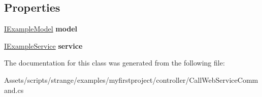 \subsection*{Properties}
\begin{DoxyCompactItemize}
\item 
\hypertarget{classstrange_1_1examples_1_1myfirstproject_1_1_call_web_service_command_ae4ff81e65df7887774bc975453f9d325}{\hyperlink{interfacestrange_1_1examples_1_1myfirstproject_1_1_i_example_model}{I\-Example\-Model} {\bfseries model}}\label{classstrange_1_1examples_1_1myfirstproject_1_1_call_web_service_command_ae4ff81e65df7887774bc975453f9d325}

\item 
\hypertarget{classstrange_1_1examples_1_1myfirstproject_1_1_call_web_service_command_ad7c23cfcbf6e6507db9bdf3167cf5e3d}{\hyperlink{interfacestrange_1_1examples_1_1myfirstproject_1_1_i_example_service}{I\-Example\-Service} {\bfseries service}}\label{classstrange_1_1examples_1_1myfirstproject_1_1_call_web_service_command_ad7c23cfcbf6e6507db9bdf3167cf5e3d}

\end{DoxyCompactItemize}


The documentation for this class was generated from the following file\-:\begin{DoxyCompactItemize}
\item 
Assets/scripts/strange/examples/myfirstproject/controller/Call\-Web\-Service\-Command.\-cs\end{DoxyCompactItemize}
